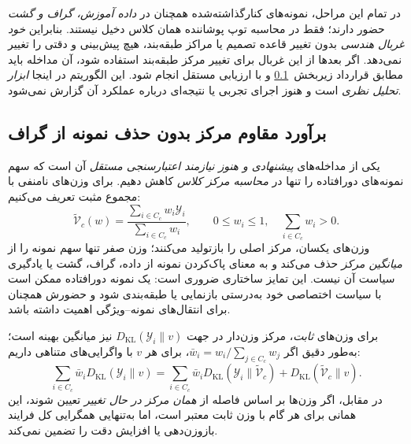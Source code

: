 در تمام این مراحل، نمونه‌های
کنارگذاشته‌شده همچنان در
\emph{داده آموزش، گراف و گشت}
حضور دارند؛ فقط در محاسبه
توپ پوشاننده همان کلاس دخیل نیستند.
بنابراین \emph{خود غربال هندسی}
بدون تغییر قاعده تصمیم یا مراکز
طبقه‌بند، هیچ پیش‌بینی و دقتی
را تغییر نمی‌دهد.
اگر بعدها از این غربال برای
تغییر مرکز طبقه‌بند استفاده شود،
آن مداخله باید مطابق قرارداد
زیربخش~\ref{subsec:ch3-outlier-robust-centers}
و با ارزیابی مستقل انجام شود.
این الگوریتم در اینجا
\emph{ابزار تحلیل نظری} است
و هنوز اجرای تجربی یا نتیجه‌ای
درباره عملکرد آن گزارش نمی‌شود.

\subsection{برآورد مقاوم مرکز بدون حذف نمونه از گراف}
\label{subsec:ch3-outlier-robust-centers}
یکی از مداخله‌های \emph{پیشنهادی و هنوز نیازمند
اعتبارسنجی مستقل} آن است که سهم نمونه‌های
دورافتاده را تنها در \emph{محاسبه مرکز کلاس}
کاهش دهیم. برای وزن‌های نامنفی با مجموع مثبت تعریف می‌کنیم:
\begin{equation}\label{eq:ch3-outlier-weighted-center}
\widetilde{\mathcal V}_c(w)=
\frac{\sum_{i\in C_c}w_i\mathscr Y_i}
{\sum_{i\in C_c}w_i},
\qquad
0\le w_i\le1,\quad \sum_{i\in C_c}w_i>0.
\end{equation}
وزن‌های یکسان، مرکز اصلی را بازتولید می‌کنند؛
وزن صفر تنها سهم نمونه را از \emph{میانگین مرکز}
حذف می‌کند و به معنای پاک‌کردن نمونه از
داده، گراف، گشت یا یادگیری سیاست آن نیست.
این تمایز ساختاری ضروری است: یک نمونه دورافتاده
ممکن است با سیاست اختصاصی خود به‌درستی
بازنمایی یا طبقه‌بندی شود و حضورش همچنان
برای انتقال‌های نمونه--ویژگی اهمیت داشته باشد.

برای وزن‌های \emph{ثابت}، مرکز وزن‌دار در جهت
$D_{\mathrm{KL}}(\mathscr Y_i\|v)$ نیز
میانگین بهینه است؛ به‌طور دقیق اگر
$\bar w_i=w_i/\sum_{j\in C_c}w_j$،
برای هر $v$ با واگرایی‌های متناهی داریم:
\begin{equation}\label{eq:ch3-outlier-weighted-kl-decomposition}
\sum_{i\in C_c}\bar w_i
D_{\mathrm{KL}}(\mathscr Y_i\|v)
=
\sum_{i\in C_c}\bar w_i
D_{\mathrm{KL}}(\mathscr Y_i\|
\widetilde{\mathcal V}_c)
+
D_{\mathrm{KL}}(\widetilde{\mathcal V}_c\|v).
\end{equation}
در مقابل، اگر وزن‌ها بر اساس فاصله از
\emph{همان مرکز در حال تغییر} تعیین شوند،
این همانی برای هر گام با وزن ثابت معتبر است،
اما به‌تنهایی همگرایی کل فرایند بازوزن‌دهی
یا افزایش دقت را تضمین نمی‌کند.

